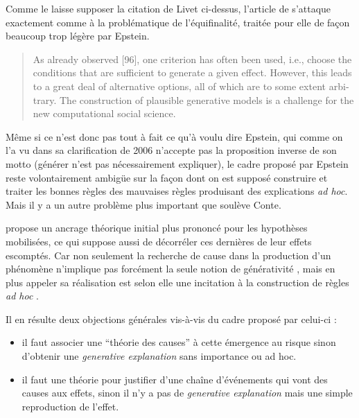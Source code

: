 Comme le laisse supposer la citation de Livet ci-dessus, l'article de \textcites{Conte2007, Conte2012} s'attaque exactement comme \textcite{Yanoff2008} à la problématique de l'équifinalité, traitée pour elle de façon beaucoup trop légère par Epstein. 

\foreignblockquote{english}[{\cite[340]{Conte2012}}]{As already observed [96], one criterion has often been used, i.e., choose the conditions that are sufficient to generate a given effect. However, this leads to a great deal of alternative options, all of which are to some extent arbitrary. The construction of plausible generative models is a challenge for the new computational social science.}

Même si ce n'est donc pas tout à fait ce qu'à voulu dire Epstein, qui comme on l'a vu dans sa clarification de 2006 n'accepte pas la proposition inverse de son motto (générer n'est pas nécessairement expliquer), le cadre proposé par Epstein reste volontairement ambigüe sur la façon dont on est supposé construire et traiter les bonnes règles des mauvaises règles produisant des explications \textit{ad hoc}. Mais il y a un autre problème plus important que soulève Conte. 

\textcite{Conte2007} propose un ancrage théorique initial plus prononcé pour les hypothèses mobilisées, ce qui suppose aussi de décorréler ces dernières de leur effets escomptés. Car non seulement la recherche de cause dans la production d'un phénomène n'implique pas forcément la seule notion de générativité , mais en plus appeler sa réalisation est selon elle une incitation à la construction de règles \textit{ad hoc} .
 
Il en résulte deux objections générales vis-à-vis du cadre proposé par celui-ci : 
\begin{itemize}
\item il faut associer une \enquote{théorie des causes} à cette émergence au risque sinon d'obtenir une \textit{generative explanation} sans importance ou ad hoc.
\item il faut une théorie pour justifier d'une chaîne d'événements qui vont des causes aux effets, sinon il n'y a pas de \textit{generative explanation} mais une simple reproduction de l'effet.
\end{itemize}


